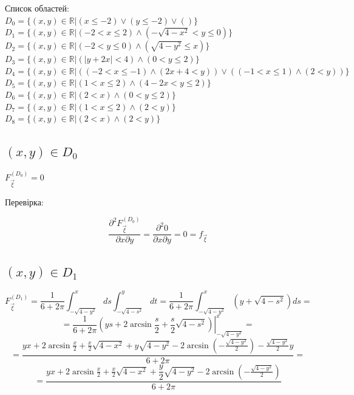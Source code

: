 \documentclass[14pt, a4paper, ukrainian]{extreport}
\begin{document}
	Список областей:\\
	$ D_0 = \{(x, y) \in \mathbb{R} | (x \le -2) \vee (y \le -2) \vee ()\}
	$\\
	$ D_1 = \{(x, y) \in \mathbb{R} | (-2 < x \le 2) \wedge (-\sqrt{4-x^2} < y \le 0)\}
	$\\
	$ D_2 = \{(x, y) \in \mathbb{R} | (-2 < y \le 0) \wedge (\sqrt{4 - y^2} \le x)\}
	$\\
	$ D_3 = \{(x, y) \in \mathbb{R} | (|y + 2x| < 4) \wedge (0 < y \le 2)\}
	$\\
	$ D_4 = \{(x, y) \in \mathbb{R} | ((-2 < x \le -1) \wedge (2x + 4 < y)) \vee ((-1 < x \le 1) \wedge (2 < y))\}
	$\\
	$ D_5 = \{(x, y) \in \mathbb{R} | (1 < x \le 2) \wedge (4 - 2x < y \le 2)\}
	$\\
	$ D_6 = \{(x, y) \in \mathbb{R} | (2 < x) \wedge (0 < y \le 2)\}
	$\\
	$ D_7 = \{(x, y) \in \mathbb{R} | (1 < x \le 2) \wedge (2 < y)\}
	$\\
	$ D_8 = \{(x, y) \in \mathbb{R} | (2 < x) \wedge (2 < y)\}
	$\\
	
	\subsection{ $(x, y) \in D_0$ }
	$F_{\vec \xi}^{\left(D_0\right)} = 0$
	
	Перевірка: 
	
	$$\frac{\partial^2F_{\vec\xi}^{\left(D_0\right)}}{\partial x \partial y} = \frac{\partial^2 0 }{\partial x \partial y} = 0 = f_{\vec{\xi}}
	$$
	
	\subsection{$(x, y) \in D_1 $}
	
	$$ F_{\vec \xi}^{\left(D_1\right)} = \frac{1}{6 + 2\pi}\int_{-\sqrt{4-y^2}}^{x}ds\int_{-\sqrt{4-s^2}}^{y}dt = \frac{1}{6+2\pi}\int_{-\sqrt{4-y^2}}^{x}(y + \sqrt{4-s^2})ds = 
	$$ 
	$$ = \frac{1}{6+2\pi}\left.\left(ys + 2\arcsin\frac{s}{2} + \frac{s}{2}\sqrt{4-s^2}\right)\right|_{-\sqrt{4-y^2}}^x =
	$$
	$$ = \dfrac{yx + 2\arcsin\frac{x}{2} + \frac{x}{2}\sqrt{4-x^2} + y\sqrt{4-y^2} - 2\arcsin{\left(-\frac{\sqrt{4-y^2}}{2}\right)} - \frac{\sqrt{4-y^2}}{2}y}{6+2\pi} = 
	$$
	$$ = \dfrac{yx + 2\arcsin\frac{x}{2} + \frac{x}{2}\sqrt{4-x^2} + \dfrac{y}{2}\sqrt{4-y^2} - 2\arcsin{\left(-\frac{\sqrt{4-y^2}}{2}\right)}}{6+2\pi}
	$$
	
\end{document}

